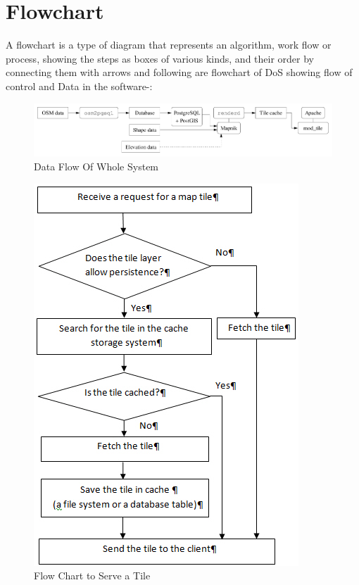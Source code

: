 \section{Flowchart}
A flowchart is a type of diagram that represents an algorithm, work flow or process, showing the steps as boxes of various kinds, and their order by connecting them with arrows
and following are flowchart of DoS showing flow of control and Data in the software-:

\begin{figure}[h!]
	\centering
	\includegraphics[scale=0.6]{input/images/osmserv.png}
	\caption{Data Flow Of Whole System}
\end{figure}



\begin{figure}[h!]
\centering
\includegraphics[scale=0.9]{input/images/fetch.jpg}
\caption{Flow Chart to Serve a Tile}
\end{figure}
\hspace{-1.7em}



